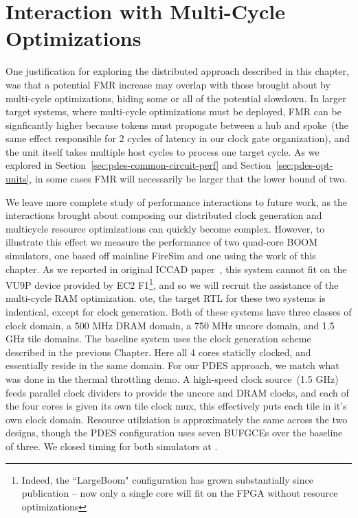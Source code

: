 \section{Interaction with Multi-Cycle Optimizations}

One justification for exploring the distributed approach described in this
chapter, was that a potential FMR increase may overlap with those brought about
by multi-cycle optimizations, hiding some or all of the potential slowdown. 
 In larger target systems, where multi-cycle
optimizations must be deployed, FMR can be signficantly higher because tokens
must propogate between a hub and spoke~(the same effect responsible for 2
cycles of latency in our clock gate organization), and the unit itself takes
multiple host cycles to process one target cycle.
As we explored in
Section~\ref{sec:pdes-common-circuit-perf} and
Section~\ref{sec:pdes-opt-units}, in some cases FMR will necessarily be larger
that the lower bound of two.

We leave more complete study of performance interactions to future work, as the
interactions brought about composing our distributed clock generation and
multicycle resource optimizations can quickly become complex. However, to
illustrate this effect we measure the performance of two quad-core BOOM
simulators, one based off mainline FireSim and one using the work of this
chapter. As we reported in original ICCAD paper~\cite{GoldenGate}, this system
cannot fit on the VU9P device provided by EC2 F1\footnote{Indeed, the
``LargeBoom" configuration has grown substantially since publication -- now
only a single core will fit on the FPGA without resource
optimizations}, and so we will recruit the assistance
of the multi-cycle RAM optimization.  ote, the target RTL for these two systems
is indentical, except for clock generation.  Both of these systems have three
classes of clock domain, a 500 MHz DRAM domain, a 750 MHz uncore domain, and
1.5 GHz tile domains. The baseline system uses the clock generation scheme
described in the previous Chapter. Here all 4 cores staticlly clocked, and
essentially reside in the same domain.  For our PDES approach, we match what
was done in the thermal throttling demo. A high-speed clock source~(1.5 GHz)
feeds parallel clock dividers to provide the uncore and DRAM clocks, and each
of the four cores is given its own tile clock mux, this effectively puts each
tile in it's own clock domain. Resource utilziation is approximately the same
across the two designs, though the PDES configuration uses seven BUFGCEs over
the baseline of three.  We closed timing for both simulators at .


